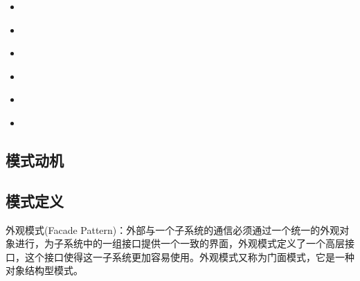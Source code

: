\documentclass[letterpaper,10pt,english]{sphinxmanual}
\begin{document}
\begin{sphinxShadowBox}
\begin{itemize}
\begin{itemize}
\item {} 
\sphinxAtStartPar
{}\label{\detokenize{structural_patterns/facade:id24}}{\hyperref[\detokenize{structural_patterns/facade:id10}]{}}

\item {} 
\sphinxAtStartPar
{}\label{\detokenize{structural_patterns/facade:id25}}{\hyperref[\detokenize{structural_patterns/facade:id11}]{}}

\item {} 
\sphinxAtStartPar
{}\label{\detokenize{structural_patterns/facade:id26}}{\hyperref[\detokenize{structural_patterns/facade:id12}]{}}

\item {} 
\sphinxAtStartPar
{}\label{\detokenize{structural_patterns/facade:id27}}{\hyperref[\detokenize{structural_patterns/facade:id13}]{}}

\item {} 
\sphinxAtStartPar
{}\label{\detokenize{structural_patterns/facade:id28}}{\hyperref[\detokenize{structural_patterns/facade:id14}]{}}

\item {} 
\sphinxAtStartPar
{}\label{\detokenize{structural_patterns/facade:id29}}{\hyperref[\detokenize{structural_patterns/facade:id15}]{}}

\end{itemize}

\end{itemize}
\end{sphinxShadowBox}


\subsection{模式动机}
\label{\detokenize{structural_patterns/facade:id3}}

\subsection{模式定义}
\label{\detokenize{structural_patterns/facade:id4}}
\sphinxAtStartPar
外观模式(Facade Pattern)：外部与一个子系统的通信必须通过一个统一的外观对象进行，为子系统中的一组接口提供一个一致的界面，外观模式定义了一个高层接口，这个接口使得这一子系统更加容易使用。外观模式又称为门面模式，它是一种对象结构型模式。
\end{document}
